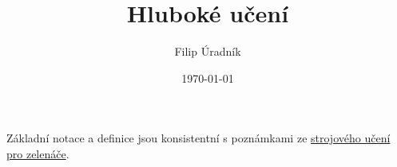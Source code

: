 \documentclass{article}
\title{Hluboké učení}
\author{Filip Úradník}
\date{\today}
\begin{document}
\maketitle

Základní notace a definice jsou konsistentní s poznámkami ze \href{https://gitlab.mff.cuni.cz/uradnikf/bc_lec/-/jobs/artifacts/master/raw/out/2324z_introml.pdf?job=build}{strojového učení pro zelenáče}.
\end{document}
